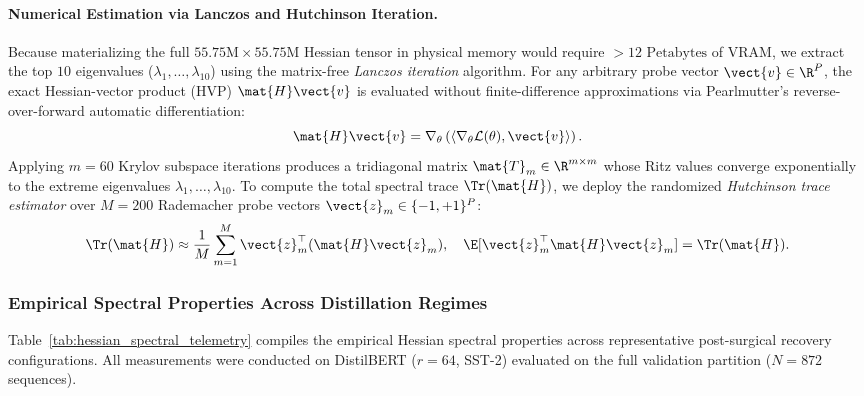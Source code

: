 \paragraph{Numerical Estimation via Lanczos and Hutchinson Iteration.}
Because materializing the full $55.75\text{M} \times 55.75\text{M}$ Hessian tensor in physical memory would require $>12\text{ Petabytes}$ of VRAM, we extract the top $10$ eigenvalues ($\lambda_1, \dots, \lambda_{10}$) using the matrix-free \emph{Lanczos iteration} algorithm. For any arbitrary probe vector $\vect{v} \in \R^P$, the exact Hessian-vector product (HVP) $\mat{H}\vect{v}$ is evaluated without finite-difference approximations via Pearlmutter's reverse-over-forward automatic differentiation:
\begin{equation}
\mat{H}\vect{v} = \nabla_\theta \left( \langle \nabla_\theta \mathcal{L}(\theta), \vect{v} \rangle \right).
\label{eq:hvp_autograd}
\end{equation}
Applying $m=60$ Krylov subspace iterations produces a tridiagonal matrix $\mat{T}_m \in \R^{m \times m}$ whose Ritz values converge exponentially to the extreme eigenvalues $\lambda_1, \dots, \lambda_{10}$. To compute the total spectral trace $\Tr(\mat{H})$, we deploy the randomized \emph{Hutchinson trace estimator} over $M = 200$ Rademacher probe vectors $\vect{z}_m \in \{-1, +1\}^P$:
\begin{equation}
\Tr(\mat{H}) \approx \frac{1}{M} \sum_{m=1}^M \vect{z}_m^\top (\mat{H} \vect{z}_m), \quad \E[\vect{z}_m^\top \mat{H} \vect{z}_m] = \Tr(\mat{H}).
\label{eq:hutchinson_trace}
\end{equation}

\subsubsection{Empirical Spectral Properties Across Distillation Regimes}
\label{sec:ablations_spectral_results}

Table~\ref{tab:hessian_spectral_telemetry} compiles the empirical Hessian spectral properties across representative post-surgical recovery configurations. All measurements were conducted on DistilBERT ($r=64$, SST-2) evaluated on the full validation partition ($N = 872$ sequences).


